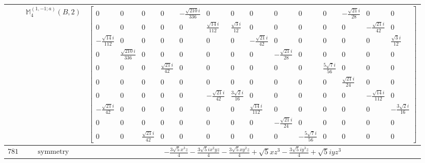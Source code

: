 \documentclass[fleqn,8pt,landscape]{jsarticle}
\begin{document}
\begin{longtable}{ccc}
$  $ & $ \mathbb{M}_{4}^{(1,-1;a)}(B,2) $ & $ \begin{bmatrix} 0 & 0 & 0 & 0 & - \frac{\sqrt{210} i}{336} & 0 & 0 & 0 & 0 & 0 & 0 & - \frac{\sqrt{21} i}{28} & 0 & 0 \\ 0 & 0 & 0 & 0 & 0 & \frac{\sqrt{14} i}{112} & \frac{\sqrt{3} i}{12} & 0 & 0 & 0 & 0 & 0 & - \frac{\sqrt{21} i}{42} & 0 \\ - \frac{\sqrt{14} i}{112} & 0 & 0 & 0 & 0 & 0 & 0 & - \frac{\sqrt{21} i}{42} & 0 & 0 & 0 & 0 & 0 & \frac{\sqrt{3} i}{12} \\ 0 & \frac{\sqrt{210} i}{336} & 0 & 0 & 0 & 0 & 0 & 0 & - \frac{\sqrt{21} i}{28} & 0 & 0 & 0 & 0 & 0 \\ 0 & 0 & 0 & \frac{\sqrt{21} i}{42} & 0 & 0 & 0 & 0 & 0 & 0 & \frac{5 \sqrt{7} i}{56} & 0 & 0 & 0 \\ 0 & 0 & 0 & 0 & 0 & 0 & 0 & 0 & 0 & 0 & 0 & \frac{\sqrt{21} i}{24} & 0 & 0 \\ 0 & 0 & 0 & 0 & 0 & - \frac{\sqrt{21} i}{42} & \frac{3 \sqrt{2} i}{16} & 0 & 0 & 0 & 0 & 0 & - \frac{\sqrt{14} i}{112} & 0 \\ - \frac{\sqrt{21} i}{42} & 0 & 0 & 0 & 0 & 0 & 0 & \frac{\sqrt{14} i}{112} & 0 & 0 & 0 & 0 & 0 & - \frac{3 \sqrt{2} i}{16} \\ 0 & 0 & 0 & 0 & 0 & 0 & 0 & 0 & - \frac{\sqrt{21} i}{24} & 0 & 0 & 0 & 0 & 0 \\ 0 & 0 & \frac{\sqrt{21} i}{42} & 0 & 0 & 0 & 0 & 0 & 0 & - \frac{5 \sqrt{7} i}{56} & 0 & 0 & 0 & 0 \end{bmatrix} $ \\ \hline
$ 781 $ & $ \text{symmetry} $ & $ - \frac{3 \sqrt{5} x^{3} z}{4} - \frac{3 \sqrt{5} i x^{2} y z}{4} - \frac{3 \sqrt{5} x y^{2} z}{4} + \sqrt{5} x z^{3} - \frac{3 \sqrt{5} i y^{3} z}{4} + \sqrt{5} i y z^{3} $ \\

\end{longtable}
\end{document}
